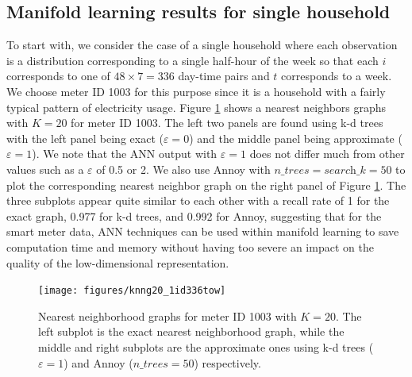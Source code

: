 \documentclass[11pt,a4paper,]{article}
\begin{document}
\hypertarget{electricityresults}{%
\subsection{Manifold learning results for single household}\label{electricityresults}}

To start with, we consider the case of a single household where each observation is a distribution corresponding to a single half-hour of the week so that each \(i\) corresponds to one of \(48 \times 7 = 336\) day-time pairs and \(t\) corresponds to a week. We choose meter ID 1003 for this purpose since it is a household with a fairly typical pattern of electricity usage. Figure \ref{fig:neighborplot} shows a nearest neighbors graphs with \(K=20\) for meter ID 1003. The left two panels are found using k-d trees with the left panel being exact (\(\varepsilon = 0\)) and the middle panel being approximate (\(\varepsilon = 1\)).
We note that the ANN output with \(\varepsilon = 1\) does not differ much from other values such as a \(\varepsilon\) of 0.5 or 2. We also use Annoy with \(\textit{n\_trees}=\textit{search\_k}=50\) to plot the corresponding nearest neighbor graph on the right panel of Figure \ref{fig:neighborplot}.
The three subplots appear quite similar to each other with a recall rate of 1 for the exact graph, 0.977 for k-d trees, and 0.992 for Annoy, suggesting that for the smart meter data, ANN techniques can be used within manifold learning to save computation time and memory without having too severe an impact on the quality of the low-dimensional representation.

\begin{figure}

{\centering \texttt{[image: figures/knng20\_1id336tow]} 

}

\caption{Nearest neighborhood graphs for meter ID 1003 with $K=20$. The left subplot is the exact nearest neighborhood graph, while the middle and right subplots are the approximate ones using k-d trees ($\varepsilon = 1$) and Annoy ($\textit{n\_trees}=50$) respectively.}\label{fig:neighborplot}
\end{figure}
\end{document}
